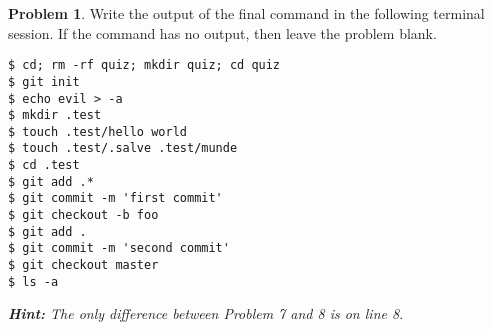 \documentclass[10pt]{article}
\theoremstyle{definition}
\newtheorem{problem}{Problem}
\begin{document}
\filbreak
\begin{problem}
    Write the output of the final command in the following terminal session.
    If the command has no output, then leave the problem blank.
\end{problem}
\begin{lstlisting}
$ cd; rm -rf quiz; mkdir quiz; cd quiz
$ git init
$ echo evil > -a
$ mkdir .test
$ touch .test/hello world
$ touch .test/.salve .test/munde
$ cd .test
$ git add .*
$ git commit -m 'first commit'
$ git checkout -b foo
$ git add .
$ git commit -m 'second commit'
$ git checkout master
$ ls -a
\end{lstlisting}

\vspace{2in}
\noindent
\emph{
\textbf{Hint:}
The only difference between Problem 7 and 8 is on line 8.
}

\end{document}
